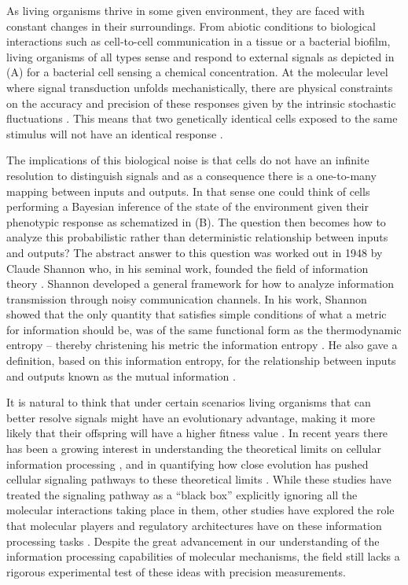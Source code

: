 As living organisms thrive in some given environment, they are faced with
constant changes in their surroundings. From abiotic conditions to biological
interactions such as cell-to-cell communication in a tissue or a bacterial
biofilm, living organisms of all types sense and respond to external signals as
depicted in (A) for a bacterial cell sensing a chemical
concentration. At the molecular level where signal transduction unfolds
mechanistically, there are physical constraints on the accuracy and precision of
these responses given by the intrinsic stochastic fluctuations
\cite{Nemenman2010}. This means that two genetically identical cells exposed to
the same stimulus will not have an identical response \cite{Eldar2010}.

The implications of this biological noise is that cells do not have an infinite
resolution to distinguish signals and as a consequence there is a one-to-many
mapping between inputs and outputs. In that sense one could think of cells
performing a Bayesian inference of the state of the environment given their
phenotypic response as schematized in (B). The question then
becomes how to analyze this probabilistic rather than deterministic relationship
between inputs and outputs? The abstract answer to this question was worked out
in 1948 by Claude Shannon who, in his seminal work, founded the field of
information theory \cite{Shannon1948}. Shannon developed a general framework for
how to analyze information transmission through noisy communication channels. In
his work, Shannon showed that the only quantity that satisfies simple conditions
of what a metric for information should be, was of the same functional form as
the thermodynamic entropy -- thereby christening his metric the information
entropy \cite{MacKay2003}. He also gave a definition, based on this information
entropy, for the relationship between inputs and outputs known as the mutual
information .

It is natural to think that under certain scenarios living organisms that can
better resolve signals might have an evolutionary advantage, making it more
likely that their offspring will have a higher fitness value \cite{Taylor2007a}.
In recent years there has been a growing interest in understanding the
theoretical limits on cellular information processing \cite{Bialek2005,
Gregor2007}, and in quantifying how close evolution has pushed cellular
signaling pathways to these theoretical limits \cite{Tkacik2008, Dubuis2013,
Petkova2016}. While these studies have treated the signaling pathway as a
``black box'' explicitly ignoring all the molecular interactions taking place in
them, other studies have explored the role that molecular players and regulatory
architectures have on these information processing tasks \cite{Rieckh2014,
Ziv2007, Voliotis2014, Tostevin2009, Tkacik2011, Tkacik2008a, Tabbaa2014}.
Despite the great advancement in our understanding of the information
processing capabilities of molecular mechanisms, the field still lacks a
rigorous experimental test of these ideas with precision measurements.

